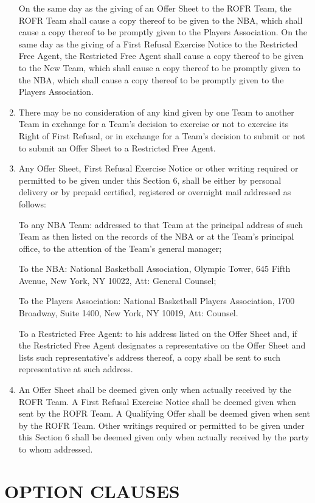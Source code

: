 \documentclass[
]{book}
\begin{document}
\begin{enumerate}
  On the same day as the giving of an Offer Sheet to the ROFR Team, the ROFR Team shall cause a copy thereof to be given to the NBA, which shall cause a copy thereof to be promptly given to the Players Association. On the same day as the giving of a First Refusal Exercise Notice to the Restricted Free Agent, the Restricted Free Agent shall cause a copy thereof to be given to the New Team, which shall cause a copy thereof to be promptly given to the NBA, which shall cause a copy thereof to be promptly given to the Players Association.
\item
  There may be no consideration of any kind given by one Team to another Team in exchange for a Team's decision to exercise or not to exercise its Right of First Refusal, or in exchange for a Team's decision to submit or not to submit an Offer Sheet to a Restricted Free Agent.
\item
  Any Offer Sheet, First Refusal Exercise Notice or other writing required or permitted to be given under this Section 6, shall be either by personal delivery or by prepaid certified, registered or overnight mail addressed as follows:

  To any NBA Team: addressed to that Team at the principal address of such Team as then listed on the records of the NBA or at the Team's principal office, to the attention of the Team's general manager;

  To the NBA: National Basketball Association, Olympic Tower, 645 Fifth Avenue, New York, NY 10022, Att: General Counsel;

  To the Players Association: National Basketball Players Association, 1700 Broadway, Suite 1400, New York, NY 10019, Att: Counsel.

  To a Restricted Free Agent: to his address listed on the Offer Sheet and, if the Restricted Free Agent designates a representative on the Offer Sheet and lists such representative's address thereof, a copy shall be sent to such representative at such address.
\item
  An Offer Sheet shall be deemed given only when actually received by the ROFR Team. A First Refusal Exercise Notice shall be deemed given when sent by the ROFR Team. A Qualifying Offer shall be deemed given when sent by the ROFR Team. Other writings required or permitted to be given under this Section 6 shall be deemed given only when actually received by the party to whom addressed.
\end{enumerate}

\hypertarget{option-clauses}{%
\chapter{OPTION CLAUSES}\label{option-clauses}}
\end{document}
